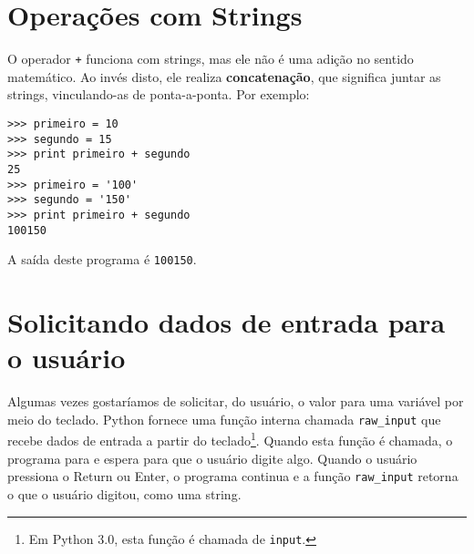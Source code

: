 \section{Operações com Strings}


O operador {\tt +} funciona com strings, mas ele 
não é uma adição no sentido matemático. Ao invés disto, ele realiza 
{\bf concatenação}, que significa juntar as strings,
vinculando-as de ponta-a-ponta. Por exemplo:


\beforeverb
\begin{verbatim}
>>> primeiro = 10
>>> segundo = 15
>>> print primeiro + segundo
25
>>> primeiro = '100'
>>> segundo = '150'
>>> print primeiro + segundo
100150
\end{verbatim}
\afterverb
%

A saída deste programa é {\tt 100150}.

\section{Solicitando dados de entrada para o usuário}


Algumas vezes gostaríamos de solicitar, do usuário, o valor para uma variável
por meio do teclado.
Python fornece uma função interna chamada \verb"raw_input" que recebe
dados de entrada a partir do teclado\footnote{Em Python 3.0, esta função é chamada de 
{\tt input}.}. Quando esta função é chamada, o programa para e 
espera para que o usuário digite algo. Quando o usuário pressiona o 
{\sf Return} ou {\sf Enter}, o programa continua e a função \verb"raw_input"
retorna o que o usuário digitou, como uma string.

